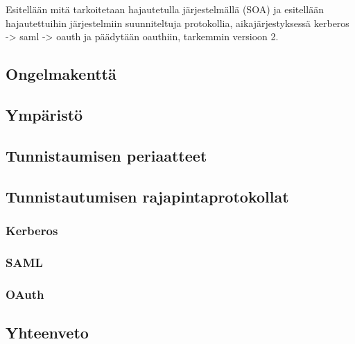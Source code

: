 Esitellään mitä tarkoitetaan hajautetulla järjestelmällä (SOA) ja esitellään hajautettuihin järjestelmiin suunniteltuja protokollia, aikajärjestyksessä  kerberos -> saml -> oauth ja päädytään oauthiin, tarkemmin versioon 2.


\subsection{Ongelmakenttä}

\subsection{Ympäristö}

\subsection{Tunnistaumisen periaatteet}

\subsection{Tunnistautumisen rajapintaprotokollat}

\subsubsection{Kerberos}

\subsubsection{SAML}

\subsubsection{OAuth}

\subsection{Yhteenveto}
